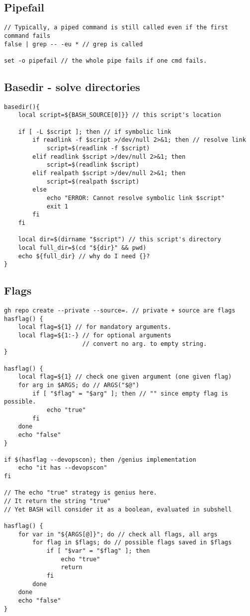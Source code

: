 \subsection{Pipefail}

\begin{verbatim}
// Typically, a piped command is still called even if the first command fails
false | grep -- -eu * // grep is called

set -o pipefail // the whole pipe fails if one cmd fails. 
\end{verbatim}

\subsection{Basedir - solve directories}

\begin{verbatim}
basedir(){
    local script=${BASH_SOURCE[0]}} // this script's location

    if [ -L $script ]; then // if symbolic link
        if readlink -f $script >/dev/null 2>&1; then // resolve link
            script=$(readlink -f $script)
        elif readlink $script >/dev/null 2>&1; then
            script=$(readlink $script)
        elif realpath $script >/dev/null 2>&1; then
            script=$(realpath $script)
        else
            echo "ERROR: Cannot resolve symbolic link $script"
            exit 1 
        fi
    fi

    local dir=$(dirname "$script") // this script's directory
    local full_dir=$(cd "${dir}" && pwd)
    echo ${full_dir} // why do I need {}?
}
\end{verbatim}

\subsection{Flags}

\begin{verbatim}
gh repo create --private --source=. // private + source are flags
hasflag() {
    local flag=${1} // for mandatory arguments. 
    local flag=${1:-} // for optional arguments
                      // convert no arg. to empty string. 
}

hasflag() {
    local flag=${1} // check one given argument (one given flag)
    for arg in $ARGS; do // ARGS("$@")
        if [ "$flag" = "$arg" ]; then // "" since empty flag is possible.
            echo "true"
        fi
    done
    echo "false"
}

if $(hasflag --devopscon); then /genius implementation
    echo "it has --devopscon"
fi

// The echo "true" strategy is genius here. 
// It return the string "true"
// Yet BASH will consider it as a boolean, evaluated in subshell

hasflag() {
    for var in "${ARGS[@]}"; do // check all flags, all args
        for flag in $flags; do // possible flags saved in $flags
            if [ "$var" = "$flag" ]; then
                echo "true"
                return
            fi
        done
    done
    echo "false"
}
\end{verbatim}

